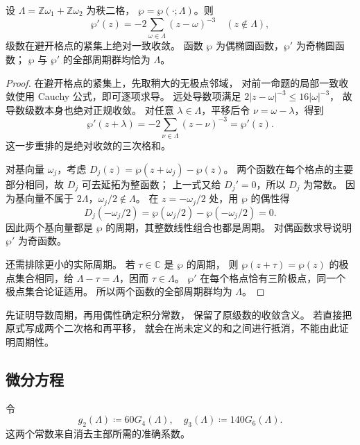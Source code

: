 \begin{proposition}[导数与全部周期]\label{b3:prop:22-wp-periods}
设 \(\Lambda=\mathbb Z\omega_1+\mathbb Z\omega_2\) 为秩二格，
\(\wp=\wp(\cdot;\Lambda)\)。则
\[
 \wp'(z)=-2\sum_{\omega\in\Lambda}(z-\omega)^{-3}
 \quad(z\notin\Lambda),
\]
级数在避开格点的紧集上绝对一致收敛。
函数 \(\wp\) 为偶椭圆函数，\(\wp'\) 为奇椭圆函数；
\(\wp\) 与 \(\wp'\) 的全部周期群均恰为 \(\Lambda\)。
\end{proposition}
\begin{proof}
在避开格点的紧集上，先取稍大的无极点邻域，
对前一命题的局部一致收敛使用 Cauchy 公式，即可逐项求导。
远处导数项满足
\(2|z-\omega|^{-3}\le16|\omega|^{-3}\)，
故导数级数本身也绝对正规收敛。
对任意 \(\lambda\in\Lambda\)，平移后令 \(\nu=\omega-\lambda\)，得到
\[
 \wp'(z+\lambda)
 =-2\sum_{\nu\in\Lambda}(z-\nu)^{-3}=\wp'(z).
\]
这一步重排的是绝对收敛的三次格和。

对基向量 \(\omega_j\)，考虑
\(D_j(z)=\wp(z+\omega_j)-\wp(z)\)。
两个函数在每个格点的主要部分相同，故 \(D_j\) 可去延拓为整函数；
上一式又给 \(D_j'=0\)，所以 \(D_j\) 为常数。
因为基向量不属于 \(2\Lambda\)，\(\omega_j/2\notin\Lambda\)。
在 \(z=-\omega_j/2\) 处，用 \(\wp\) 的偶性得
\[
 D_j(-\omega_j/2)=\wp(\omega_j/2)-\wp(-\omega_j/2)=0.
\]
因此两个基向量都是 \(\wp\) 的周期，其整数线性组合也都是周期。
对偶函数求导说明 \(\wp'\) 为奇函数。

还需排除更小的实际周期。
若 \(\tau\in\mathbb C\) 是 \(\wp\) 的周期，
则 \(\wp(z+\tau)=\wp(z)\) 的极点集合相同，给
\(\Lambda-\tau=\Lambda\)，因而 \(\tau\in\Lambda\)。
\(\wp'\) 在每个格点恰有三阶极点，同一个极点集合论证适用。
所以两个函数的全部周期群均为 \(\Lambda\)。
\end{proof}

先证明导数周期，再用偶性确定积分常数，
保留了原级数的收敛含义。
若直接把原式写成两个二次格和再平移，
就会在尚未定义的和之间进行抵消，不能由此证明周期性。

\subsection{微分方程}
\label{b3:subsec:220303}

令
\[
 g_2(\Lambda)\coloneqq60G_4(\Lambda),\quad
 g_3(\Lambda)\coloneqq140G_6(\Lambda).
\]
这两个常数来自消去主部所需的准确系数。

